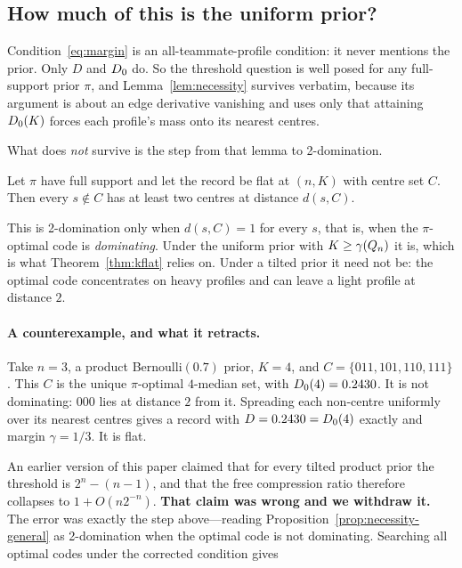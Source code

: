 \subsection{How much of this is the uniform prior?}
\label{sec:priors}

Condition~\eqref{eq:margin} is an all-teammate-profile condition: it never
mentions the prior. Only $D$ and $D_0$ do. So the threshold question is well
posed for any full-support prior $\pi$, and Lemma~\ref{lem:necessity} survives
verbatim, because its argument is about an edge derivative vanishing and uses
only that attaining $D_0(K)$ forces each profile's mass onto its nearest
centres.

What does \emph{not} survive is the step from that lemma to 2-domination.

\begin{proposition}
\label{prop:necessity-general}
Let $\pi$ have full support and let the record be flat at $(n,K)$ with centre set
$C$. Then every $s \notin C$ has at least two centres at distance $d(s,C)$.
\end{proposition}

This is 2-domination only when $d(s,C) = 1$ for every $s$, that is, when the
$\pi$-optimal code is \emph{dominating}. Under the uniform prior with
$K \ge \gamma(Q_n)$ it is, which is what Theorem~\ref{thm:kflat} relies on. Under
a tilted prior it need not be: the optimal code concentrates on heavy profiles
and can leave a light profile at distance $2$.

\paragraph{A counterexample, and what it retracts.}
Take $n = 3$, a product Bernoulli$(0.7)$ prior, $K = 4$, and
$C = \{011, 101, 110, 111\}$. This $C$ is the unique $\pi$-optimal $4$-median set,
with $D_0(4) = 0.2430$. It is not dominating: $000$ lies at distance $2$ from
it. Spreading each non-centre uniformly over its nearest centres gives a record
with $D = 0.2430 = D_0(4)$ exactly and margin $\gamma = 1/3$. It is flat.

An earlier version of this paper claimed that for every tilted product prior the
threshold is $2^n - (n-1)$, and that the free compression ratio therefore
collapses to $1 + O(n2^{-n})$. \textbf{That claim was wrong and we withdraw it.}
The error was exactly the step above---reading
Proposition~\ref{prop:necessity-general} as 2-domination when the optimal code is
not dominating. Searching all optimal codes under the corrected condition gives

